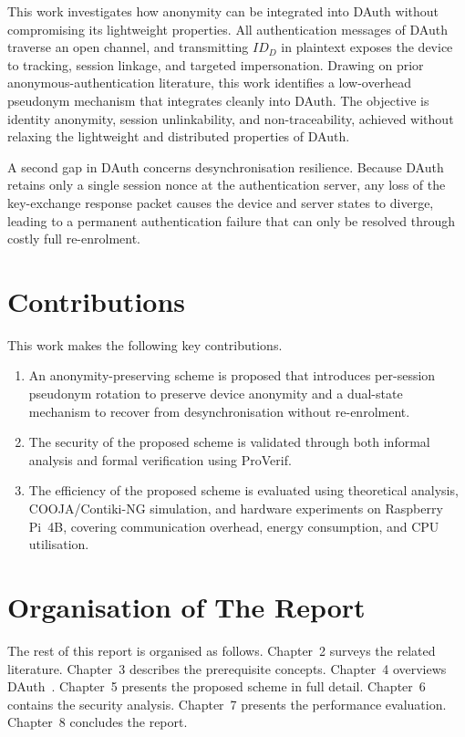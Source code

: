 This work investigates how anonymity can be integrated into DAuth without
compromising its lightweight properties.
All authentication messages of DAuth traverse an open channel, and transmitting
$ID_D$ in plaintext exposes the device to tracking, session linkage, and targeted
impersonation.
Drawing on prior anonymous-authentication literature, this work identifies a
low-overhead pseudonym mechanism that integrates cleanly into DAuth.
The objective is identity anonymity, session unlinkability, and non-traceability,
achieved without relaxing the lightweight and distributed properties of DAuth.

A second gap in DAuth concerns desynchronisation resilience.
Because DAuth retains only a single session nonce at the authentication server,
any loss of the key-exchange response packet causes the device and server states to
diverge, leading to a permanent authentication failure that can only be resolved
through costly full re-enrolment.

\section{Contributions}

This work makes the following key contributions.
\begin{enumerate}
  \item An anonymity-preserving scheme is proposed that introduces per-session
    pseudonym rotation to preserve device anonymity and a dual-state mechanism
    to recover from desynchronisation without re-enrolment.
  \item The security of the proposed scheme is validated through both informal
    analysis and formal verification using ProVerif.
  \item The efficiency of the proposed scheme is evaluated using theoretical
    analysis, COOJA\slash Contiki-NG simulation, and hardware experiments on
    Raspberry Pi~4B, covering communication overhead, energy consumption, and
    CPU utilisation.
\end{enumerate}

\section{Organisation of The Report}

The rest of this report is organised as follows.
Chapter~2 surveys the related literature.
Chapter~3 describes the prerequisite concepts.
Chapter~4 overviews DAuth~\cite{das2026comsnets}.
Chapter~5 presents the proposed scheme in full detail.
Chapter~6 contains the security analysis.
Chapter~7 presents the performance evaluation.
Chapter~8 concludes the report.
